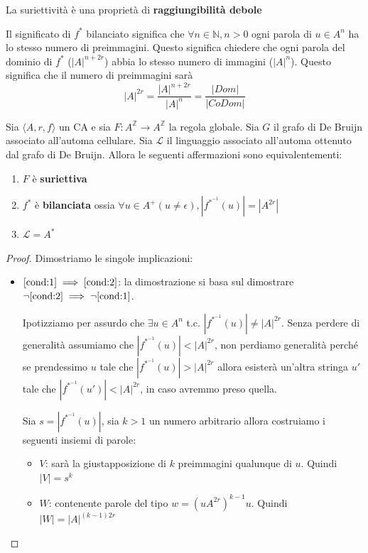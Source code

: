 La suriettività è una proprietà di \textbf{raggiungibilità debole}

\begin{nota}
    Il significato di $f^{\ast}$ bilanciato significa che $\forall n\in \mathbb{N}, n>0$
    ogni parola di $u\in A^n$ ha lo stesso numero di preimmagini. Questo significa
    chiedere che ogni parola del dominio di $f^{\ast}$ ($|A|^{n+2r}$) abbia lo stesso
    numero di immagini ($|A|^n$). Questo significa che il numero di preimmagini
    sarà
    \begin{equation*}
        |A|^{2r} = \frac{|A|^{n+2r}}{|A|^n} = \frac{|Dom|}{|CoDom|}
    \end{equation*}
\end{nota}

\begin{teorema}
    \label{th:suriettività_CA}
    Sia $\langle A,r,f\rangle$ un CA e sia $F: A^\mathbb{Z}\rightarrow A^\mathbb{Z}$
    la regola globale. Sia $G$ il grafo di De Bruijn associato all'automa cellulare.
    Sia $\mathcal{L}$ il linguaggio associato all'automa ottenuto dal grafo di De Bruijn.
    Allora le seguenti affermazioni sono equivalentementi:
    \begin{enumerate}
        \item \label{cond:1}$F$ è \textbf{suriettiva}
        \item \label{cond:2}$f^\ast$ è \textbf{bilanciata} ossia $\forall u \in A^+ (u\ne \epsilon), |f^{\ast^{-1}}(u)|= |A^{2r}|$
        \item \label{cond:3}$\mathcal{L} = A^\ast$
    \end{enumerate}
    \begin{proof}
        Dimostriamo le singole implicazioni:
        \begin{itemize}
            \item $\ref{cond:1}\implies \ref{cond:2}$: la dimostrazione si basa
                  sul dimostrare $\lnot \ref{cond:2}\implies \lnot \ref{cond:1}$.

                  Ipotizziamo per assurdo che $\exists u\in A^n$ t.c. $|f^{\ast^{-1}}(u)|\ne |A|^{2r}$.
                  Senza perdere di generalità assumiamo che $|f^{\ast^{-1}}(u)|< |A|^{2r}$,
                  non perdiamo generalità perché se prendessimo $u$ tale che $|f^{\ast^{-1}}(u)|> |A|^{2r}$
                  allora esisterà un'altra stringa $u'$ tale che $|f^{\ast^{-1}}(u')|< |A|^{2r}$,
                  in caso avremmo preso quella.

                  Sia $s = |f^{\ast^{-1}}(u)|$, sia $k>1$ un numero arbitrario allora costruiamo
                  i seguenti insiemi di parole:
                  \begin{itemize}
                      \item $V$: sarà la giustapposizione di $k$ preimmagini qualunque
                            di $u$. Quindi $|V| = s^k$
                      \item $W$: contenente parole del tipo $w=(uA^{2r})^{k-1}u$. Quindi $|W| = |A|^{(k-1)2r}$
                  \end{itemize}


\end{itemize}
\end{proof}
\end{teorema}
